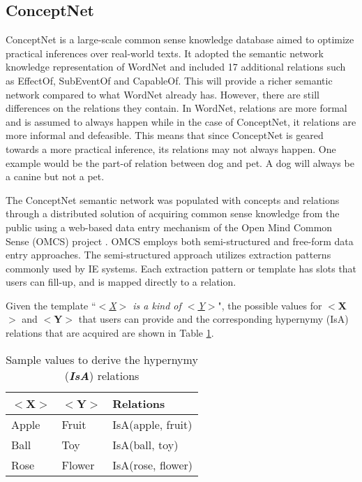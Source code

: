 \subsection{ConceptNet}
\label{sec:conceptnet}

ConceptNet \cite{Liu:2004b} is a large-scale common sense knowledge database aimed to optimize practical inferences over real-world texts. It adopted the semantic network knowledge representation of WordNet and included 17 additional relations such as EffectOf, SubEventOf and CapableOf. This will provide a richer semantic network compared to what WordNet already has. However, there are still differences on the relations they contain. In WordNet, relations are more formal and is assumed to always happen while in the case of ConceptNet, it relations are more informal and defeasible. This means that since ConceptNet is geared towards a more practical inference, its relations may not always happen. One example would be the part-of relation between dog and pet. A dog will always be a canine but not a pet. 

The ConceptNet semantic network was populated with concepts and relations through a distributed solution of acquiring common sense knowledge from the public using a web-based data entry mechanism of the Open Mind Common Sense (OMCS) project \cite{Singh:2002}. OMCS employs both semi-structured and free-form data entry approaches. The semi-structured approach utilizes extraction patterns commonly used by IE systems. Each extraction pattern or template has slots that users can fill-up, and is mapped directly to a relation.

Given the template ``\textit{\underline{$<$X$>$} is a kind of \underline{$<$Y$>$}}", the possible values for \textbf{$<$X$>$} and \textbf{$<$Y$>$} that users can provide and the corresponding hypernymy (IsA) relations that are acquired are shown in Table \ref{tab:isasamples}.

\begin{table}[ht]   %
\centering
\caption{Sample values to derive the hypernymy (\textbf{\textit{IsA}}) relations} \vspace{0.25em}
\begin{tabular}{|l|l|l|} \hline
$<$X$>$ & $<$Y$>$ & Relations \\ \hline
Apple & Fruit & IsA(apple, fruit) \\ \hline
Ball & Toy & IsA(ball, toy) \\ \hline
Rose & Flower & IsA(rose, flower) \\ \hline
\end{tabular}
\label{tab:isasamples}
\end{table}

